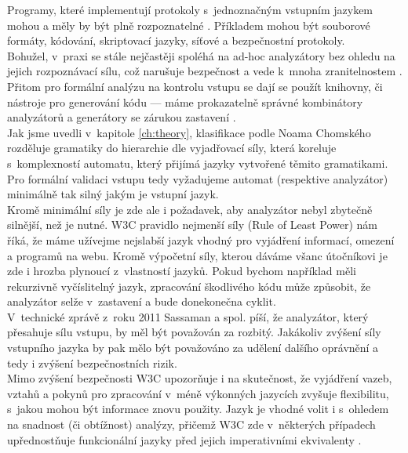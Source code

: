 Programy, které implementují protokoly s~jednoznačným vstupním jazykem mohou a měly by být plně rozpoznatelné 
\cite[str. 490]{Sass2013}. Příkladem mohou být  souborové formáty, kódování, skriptovací jazyky, síťové a bezpečnostní protokoly. \\

Bohužel, v~praxi se stále nejčastěji spoléhá na ad-hoc analyzátory bez ohledu na jejich rozpoznávací sílu, což narušuje bezpečnost a vede k~mnoha 
zranitelnostem \cite[str. 490]{Sass2013}. Přitom pro formální analýzu na kontrolu vstupu se dají se použít knihovny, či nástroje pro generování 
kódu --- máme prokazatelně správné kombinátory analyzátorů a generátory se zárukou zastavení \cite[str. 490]{Sass2013}. \\

Jak jsme uvedli v~kapitole \ref{ch:theory}, klasifikace podle Noama Chomského rozděluje gramatiky do hierarchie dle vyjadřovací síly, která koreluje 
s~komplexností automatu, který přijímá jazyky vytvořené těmito gramatikami. Pro formální validaci vstupu tedy vyžadujeme automat (respektive analyzátor) 
minimálně tak silný jakým je vstupní jazyk. \\

Kromě minimální síly je zde ale i požadavek, aby analyzátor nebyl zbytečně silnější, než je nutné.
W3C pravidlo nejmenší síly (Rule of Least Power) \cite{w3cpower} nám říká, že máme užívejme nejslabší jazyk vhodný pro vyjádření informací, 
omezení a programů na webu. Kromě výpočetní síly, kterou dáváme všanc útočníkovi je zde i hrozba plynoucí z~vlastností jazyků. Pokud bychom 
například měli rekurzivně vyčíslitelný jazyk, zpracování škodlivého kódu může způsobit, že analyzátor selže v~zastavení a bude donekonečna cyklit. \\ 

V~technické zprávě z~roku 2011 \cite[str. 22]{Sass2011} Sassaman a spol. píší, že analyzátor, který přesahuje sílu vstupu, by měl být považován za 
rozbitý. Jakákoliv zvýšení síly vstupního jazyka by pak mělo být považováno za udělení dalšího oprávnění a tedy i zvýšení bezpečnostních rizik. \\

Mimo zvýšení bezpečnosti W3C upozorňuje i na skutečnost, že vyjádření vazeb, vztahů a pokynů pro zpracování v~méně výkonných jazycích zvyšuje 
flexibilitu, s~jakou mohou být informace znovu použity. Jazyk je vhodné volit i s~ohledem na snadnost (či obtížnost) analýzy, přičemž W3C zde 
v~některých případech upřednostňuje funkcionální jazyky před jejich imperativními ekvivalenty \cite{w3cpower}. \\

